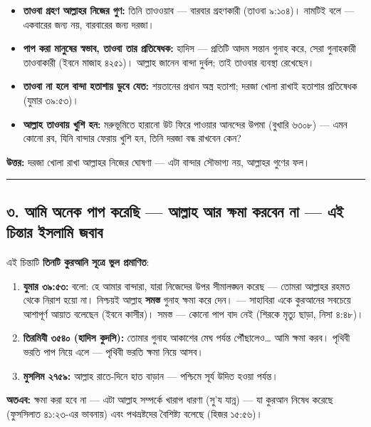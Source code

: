 \begin{itemize}
\item \textbf{তাওবা গ্রহণ আল্লাহর নিজের গুণ:} তিনি তাওওয়াব — বারবার গ্রহণকারী (তাওবা ৯:১০৪)। নামটিই বলে — একবারের জন্য নয়, বারবারের জন্য দরজা।
\item \textbf{পাপ করা মানুষের স্বভাব, তাওবা তার প্রতিষেধক:} হাদিস — প্রতিটি আদম সন্তান গুনাহ করে, সেরা গুনাহকারী তাওবাকারী (ইবনে মাজাহ ৪২৫১)। আল্লাহ জানেন বান্দা দুর্বল; তাই তাওবার ব্যবস্থা রেখেছেন।
\item \textbf{তাওবা না হলে বান্দা হতাশায় ডুবে যেত:} শয়তানের প্রধান অস্ত্র হতাশা; দরজা খোলা রাখাই হতাশার প্রতিষেধক (যুমার ৩৯:৫৩)।
\item \textbf{আল্লাহ তাওবায় খুশি হন:} মরুভূমিতে হারানো উট ফিরে পাওয়ার আনন্দের উপমা (বুখারি ৬৩০৮) — এমন কোনো রব, যিনি বান্দার ফেরায় খুশি হন, তিনি দরজা বন্ধ রাখবেন কেন?
\end{itemize}
\textbf{উত্তর:} দরজা খোলা রাখা আল্লাহর নিজের ঘোষণা — এটা বান্দার সৌভাগ্য নয়, আল্লাহর গুণের ফল।

\medskip\hrule\medskip

\subsection*{৩. আমি অনেক পাপ করেছি — আল্লাহ আর ক্ষমা করবেন না — এই চিন্তার ইসলামি জবাব}

এই চিন্তাটি \textbf{তিনটি কুরআনি সূত্রে ভুল প্রমাণিত}:

\begin{enumerate}
\item \textbf{যুমার ৩৯:৫৩:} বলো: হে আমার বান্দারা, যারা নিজেদের উপর সীমালঙ্ঘন করেছ — তোমরা আল্লাহর রহমত থেকে নিরাশ হয়ো না। নিশ্চয়ই আল্লাহ \textbf{সমস্ত} গুনাহ ক্ষমা করে দেন। — সাহাবিরা একে কুরআনের সবচেয়ে আশাপূর্ণ আয়াত বলেছেন (ইবনে কাসীর)। সমস্ত — কোনো পাপ বাদ নেই (শিরকে মৃত্যু ছাড়া, নিসা ৪:৪৮)।
\item \textbf{তিরমিযী ৩৫৪০ (হাদিস কুদসি):} তোমার গুনাহ আকাশের মেঘ পর্যন্ত পৌঁছালেও… আমি ক্ষমা করব। পৃথিবী ভরতি পাপ নিয়ে এলে — পৃথিবী ভরতি ক্ষমা নিয়ে আসব।
\item \textbf{মুসলিম ২৭৫৯:} আল্লাহ রাতে-দিনে হাত বাড়ান — পশ্চিমে সূর্য উদিত হওয়া পর্যন্ত।
\end{enumerate}
\textbf{অতএব:} ক্ষমা করা হবে না — এটা আল্লাহ সম্পর্কে খারাপ ধারণা (সু'য যান্ন) — যা কুরআন নিষেধ করেছে (ফুসসিলাত ৪১:২৩-এর ভাবনায়) এবং পথভ্রষ্টদের বৈশিষ্ট্য বলেছে (হিজর ১৫:৫৬)।

